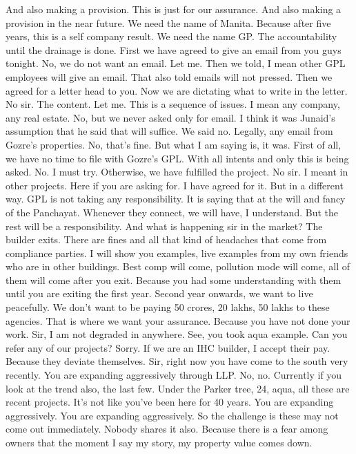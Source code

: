 And also making a provision.
This is just for our assurance.
And also making a provision in the near future.
We need the name of Manita.
Because after five years, this is a self company result.
We need the name GP.
The accountability until the drainage is done.
First we have agreed to give an email from you guys tonight.
No, we do not want an email.
Let me.
Then we told, I mean other GPL employees will give an email.
That also told emails will not pressed.
Then we agreed for a letter head to you.
Now we are dictating what to write in the letter.
No sir.
The content.
Let me.
This is a sequence of issues.
I mean any company, any real estate.
No, but we never asked only for email.
I think it was Junaid's assumption that he said that will suffice.
We said no.
Legally, any email from Gozre's properties.
No, that's fine.
But what I am saying is, it was.
First of all, we have no time to file with Gozre's GPL.
With all intents and only this is being asked.
No.
I must try.
Otherwise, we have fulfilled the project.
No sir.
I meant in other projects.
Here if you are asking for.
I have agreed for it.
But in a different way.
GPL is not taking any responsibility.
It is saying that at the will and fancy of the Panchayat.
Whenever they connect, we will have, I understand.
But the rest will be a responsibility.
And what is happening sir in the market?
The builder exits.
There are fines and all that kind of headaches that come from compliance parties.
I will show you examples, live examples from my own friends who are in other buildings.
Best comp will come, pollution mode will come, all of them will come after you exit.
Because you had some understanding with them until you are exiting the first year.
Second year onwards, we want to live peacefully.
We don't want to be paying 50 crores, 20 lakhs, 50 lakhs to these agencies.
That is where we want your assurance.
Because you have not done your work.
Sir, I am not degraded in anywhere.
See, you took aqua example.
Can you refer any of our projects?
Sorry.
If we are an IHC builder, I accept their pay.
Because they deviate themselves.
Sir, right now you have come to the south very recently.
You are expanding aggressively through LLP.
No, no.
Currently if you look at the trend also, the last few.
Under the Parker tree, 24, aqua, all these are recent projects.
It's not like you've been here for 40 years.
You are expanding aggressively.
You are expanding aggressively.
So the challenge is these may not come out immediately.
Nobody shares it also.
Because there is a fear among owners that the moment I say my story, my property value comes down.
